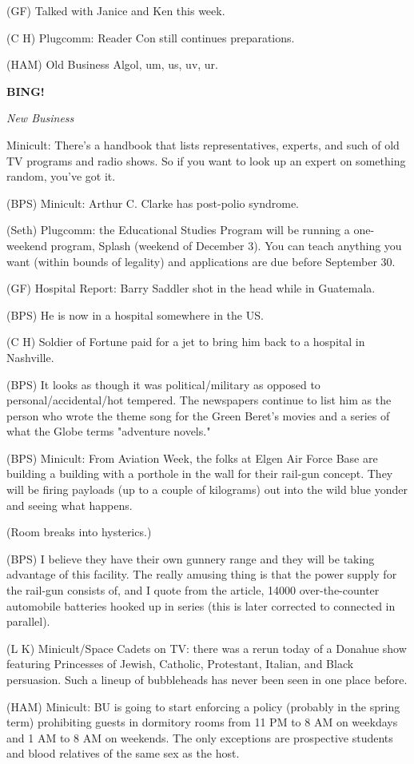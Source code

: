 \documentclass[12pt]{article}
\newcommand{\bing}{{\bf BING!} }
\newcommand{\goto}[1]{\bing \vskip 12pt \centerline{{\em{#1}}}}
\begin{document}
(GF) Talked with Janice and Ken this week.

(C H) Plugcomm: Reader Con still continues preparations.

(HAM) Old Business Algol, um, us, uv, ur.

\goto{New Business}

Minicult: There's a handbook that lists representatives, experts, and such of old TV programs and radio shows. So if you want to look up an expert on something random, you've got it.

(BPS) Minicult: Arthur C. Clarke has post-polio syndrome.

(Seth) Plugcomm: the Educational Studies Program will be running a one-weekend program, Splash (weekend of December 3). You can teach anything you want (within bounds of legality) and applications are due before September 30.

(GF) Hospital Report: Barry Saddler shot in the head while in Guatemala.

(BPS) He is now in a hospital somewhere in the US.

(C H) Soldier of Fortune paid for a jet to bring him back to a hospital in Nashville.

(BPS) It looks as though it was political/military as opposed to personal/accidental/hot tempered. The newspapers continue to list him as the person who wrote the theme song for the Green Beret's movies and a series of what the Globe terms "adventure novels."

(BPS) Minicult: From Aviation Week, the folks at Elgen Air Force Base are building a building with a porthole in the wall for their rail-gun concept. They will be firing payloads (up to a couple of kilograms) out into the wild blue yonder and seeing what happens.

(Room breaks into hysterics.)

(BPS) I believe they have their own gunnery range and they will be taking advantage of this facility. The really amusing thing is that the power supply for the rail-gun consists of, and I quote from the article, 14000 over-the-counter automobile batteries hooked up in series (this is later corrected to connected in parallel).

(L K) Minicult/Space Cadets on TV: there was a rerun today of a Donahue show featuring Princesses of Jewish, Catholic, Protestant, Italian, and Black persuasion. Such a lineup of bubbleheads has never been seen in one place before.

(HAM) Minicult: BU is going to start enforcing a policy (probably in the spring term) prohibiting guests in dormitory rooms from 11 PM to 8 AM on weekdays and 1 AM to 8 AM on weekends. The only exceptions are prospective students and blood relatives of the same sex as the host.
\end{document}
